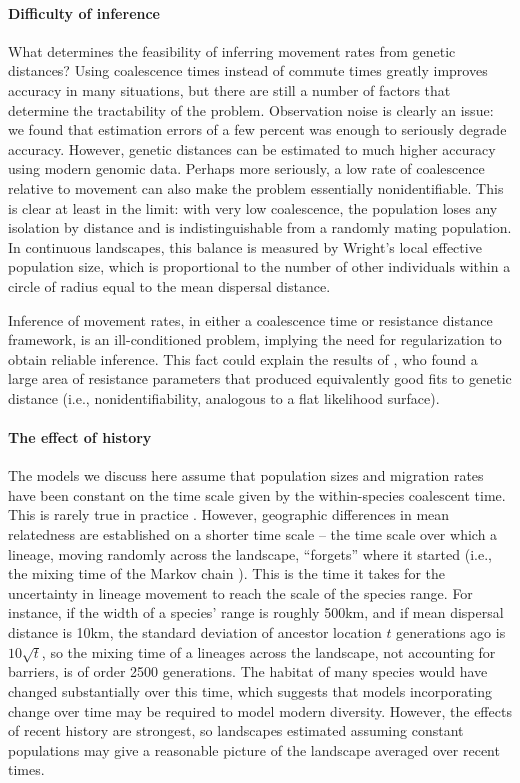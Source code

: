\documentclass{article}
\begin{document}
\paragraph{Difficulty of inference}
What determines the feasibility of inferring movement rates from genetic distances?
Using coalescence times instead of commute times greatly improves accuracy in many situations,
but there are still a number of factors that determine the tractability of the problem.
Observation noise is clearly an issue:
we found that estimation errors of a few percent was enough to seriously degrade accuracy.
However, genetic distances can be estimated to much higher accuracy using modern genomic data.
Perhaps more seriously,
a low rate of coalescence relative to movement can also make the problem essentially nonidentifiable.
This is clear at least in the limit: with very low coalescence, 
the population loses any isolation by distance and is indistinguishable from a randomly mating population.
In continuous landscapes, this balance is measured by Wright's local effective population size,
which is proportional to the number of other individuals 
within a circle of radius equal to the mean dispersal distance.

Inference of movement rates, in either a coalescence time or resistance distance framework,
is an ill-conditioned problem,
implying the need for regularization to obtain reliable inference.
This fact could explain the results of \citet{graves2013current},
who found a large area of resistance parameters
that produced equivalently good fits to genetic distance
(i.e., nonidentifiability, analogous to a flat likelihood surface).

\paragraph{The effect of history}
The models we discuss here assume that population sizes and migration rates
have been constant on the time scale given by the within-species coalescent time.
This is rarely true in practice \citep{neigel1991estimation,barton1995genealogies}.
However, geographic differences in mean relatedness
are established on a shorter time scale --
the time scale over which a lineage, moving randomly across the landscape,
``forgets'' where it started
(i.e., the mixing time of the Markov chain \citep{wilkins2004separationoftimescales}).
This is the time it takes for the uncertainty in lineage movement
to reach the scale of the species range.
For instance,
if the width of a species' range is roughly 500km,
and if mean dispersal distance is 10km,
the standard deviation of ancestor location $t$ generations ago is $10\sqrt{t}$,
so the mixing time of a lineages across the landscape,
not accounting for barriers, is of order 2500 generations.
The habitat of many species would have changed substantially over this time, %
which suggests that models incorporating change over time 
may be required to model modern diversity.
However, the effects of recent history are strongest,
so landscapes estimated assuming constant populations
may give a reasonable picture of the landscape averaged over recent times.
\end{document}
